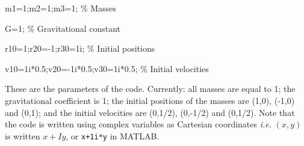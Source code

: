 \documentclass[10pt]{article}
\newcommand{\ie}{\emph{i.e.} }
\begin{document}
%
\begin{ttfamily}
m1=1;m2=1;m3=1; \% Masses

G=1; \% Gravitational constant

r10=1;r20=-1;r30=1i; \% Initial positions

v10=1i*0.5;v20=-1i*0.5;v30=1i*0.5; \% Initial velocities
\end{ttfamily}


These are the parameters of the code. Currently: all masses are equal to 1; the gravitational coefficient is 1; the initial positions of the masses are (1,0), (-1,0) and (0,1); and the initial velocities are (0,1/2), (0,-1/2) and (0,1/2). Note that the code is written using complex variables as Cartesian coordinates \ie $(x,y)$ is written $x+Iy$, or \texttt{x+1i*y} in MATLAB.
\end{document}
